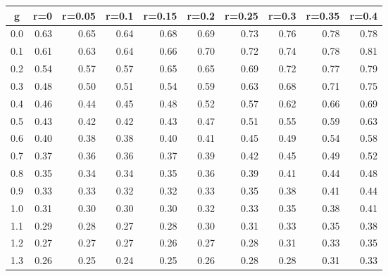 %
\begin{table}[!tbp]
 \begin{center}
 \begin{tabular}{rrrrrrrrrr}\hline\hline
\multicolumn{1}{c}{g}&\multicolumn{1}{c}{r=0}&\multicolumn{1}{c}{r=0.05}&\multicolumn{1}{c}{r=0.1}&\multicolumn{1}{c}{r=0.15}&\multicolumn{1}{c}{r=0.2}&\multicolumn{1}{c}{r=0.25}&\multicolumn{1}{c}{r=0.3}&\multicolumn{1}{c}{r=0.35}&\multicolumn{1}{c}{r=0.4}\tabularnewline
\hline
0.0&0.63&0.65&0.64&0.68&0.69&0.73&0.76&0.78&0.78\tabularnewline
0.1&0.61&0.63&0.64&0.66&0.70&0.72&0.74&0.78&0.81\tabularnewline
0.2&0.54&0.57&0.57&0.65&0.65&0.69&0.72&0.77&0.79\tabularnewline
0.3&0.48&0.50&0.51&0.54&0.59&0.63&0.68&0.71&0.75\tabularnewline
0.4&0.46&0.44&0.45&0.48&0.52&0.57&0.62&0.66&0.69\tabularnewline
0.5&0.43&0.42&0.42&0.43&0.47&0.51&0.55&0.59&0.63\tabularnewline
0.6&0.40&0.38&0.38&0.40&0.41&0.45&0.49&0.54&0.58\tabularnewline
0.7&0.37&0.36&0.36&0.37&0.39&0.42&0.45&0.49&0.52\tabularnewline
0.8&0.35&0.34&0.34&0.35&0.36&0.39&0.41&0.44&0.48\tabularnewline
0.9&0.33&0.33&0.32&0.32&0.33&0.35&0.38&0.41&0.44\tabularnewline
1.0&0.31&0.30&0.30&0.30&0.32&0.33&0.35&0.38&0.41\tabularnewline
1.1&0.29&0.28&0.27&0.28&0.30&0.31&0.33&0.35&0.38\tabularnewline
1.2&0.27&0.27&0.27&0.26&0.27&0.28&0.31&0.33&0.35\tabularnewline
1.3&0.26&0.25&0.24&0.25&0.26&0.28&0.28&0.31&0.33\tabularnewline
\hline
\end{tabular}

\end{center}

\end{table}


